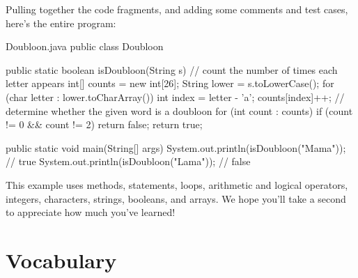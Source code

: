 Pulling together the code fragments, and adding some comments and test cases, here's the entire program:


\begin{trinket}{Doubloon.java}
public class Doubloon {

    public static boolean isDoubloon(String s) {
        // count the number of times each letter appears
        int[] counts = new int[26];
        String lower = s.toLowerCase();
        for (char letter : lower.toCharArray()) {
            int index = letter - 'a';
            counts[index]++;
        }
        // determine whether the given word is a doubloon
        for (int count : counts) {
            if (count != 0 && count != 2) {
                return false;
            }
        }
        return true;
    }

    public static void main(String[] args) {
        System.out.println(isDoubloon("Mama"));  // true
        System.out.println(isDoubloon("Lama"));  // false
    }
}
\end{trinket}


This example uses methods,  statements,  loops, arithmetic and logical operators, integers, characters, strings, booleans, and arrays.
We hope you'll take a second to appreciate how much you've learned!


\section{Vocabulary}

